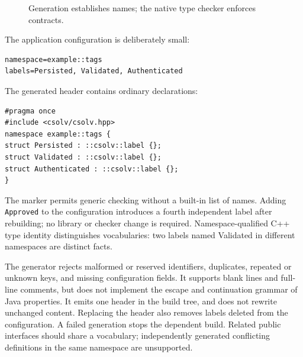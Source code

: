 \documentclass[11pt]{article}
\newcommand{\csolv}{\textsc{CSOLV}}
\begin{document}
\begin{figure}[ht]
\centering
{}
\caption{Generation establishes names; the native type checker enforces contracts.}
\label{fig:architecture}
\end{figure}

The application configuration is deliberately small:
\begin{lstlisting}[language={}]
namespace=example::tags
labels=Persisted, Validated, Authenticated
\end{lstlisting}
The generated header contains ordinary declarations:
\begin{lstlisting}
#pragma once
#include <csolv/csolv.hpp>
namespace example::tags {
struct Persisted : ::csolv::label {};
struct Validated : ::csolv::label {};
struct Authenticated : ::csolv::label {};
}
\end{lstlisting}
The marker permits generic checking without a built-in list of names. Adding
\texttt{Approved} to the configuration introduces a fourth independent label
after rebuilding; no library or checker change is required. Namespace-qualified
C++ type identity distinguishes vocabularies: two labels named Validated in
different namespaces are distinct facts.

The generator rejects malformed or reserved identifiers, duplicates, repeated
or unknown keys, and missing configuration fields. It supports blank lines and
full-line comments, but does not implement the escape and continuation grammar
of Java properties. It emits one header in the build tree, and does not rewrite
unchanged content. Replacing the header also removes labels deleted from the
configuration. A failed generation stops the dependent build. Related public
interfaces should share a vocabulary; independently generated conflicting
definitions in the same namespace are unsupported.
\end{document}
